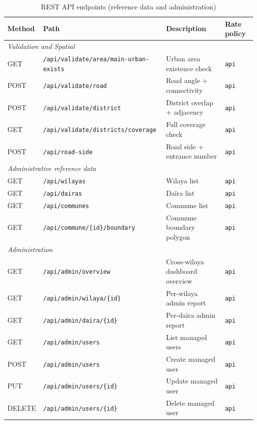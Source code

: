 \documentclass[12pt,a4paper]{article}
\theoremstyle{definition}
\theoremstyle{plain}
\theoremstyle{remark}
\begin{document}
\begin{table}[H]
\centering
\caption{REST API endpoints (reference data and administration)}
\begin{tabularx}{\textwidth}{ll>{\raggedright\arraybackslash}Xl}
\toprule
\textbf{Method} & \textbf{Path} & \textbf{Description} & \textbf{Rate policy} \\
\midrule
\multicolumn{4}{l}{\textit{Validation and Spatial}} \\
GET  & \texttt{/api/validate/area/main-urban-exists} & Urban area existence check & \texttt{api} \\
POST & \texttt{/api/validate/road}                   & Road angle + connectivity  & \texttt{api} \\
POST & \texttt{/api/validate/district}               & District overlap + adjacency & \texttt{api} \\
GET  & \texttt{/api/validate/districts/coverage}     & Full coverage check        & \texttt{api} \\
POST & \texttt{/api/road-side}                       & Road side + entrance number & \texttt{api} \\
\midrule
\multicolumn{4}{l}{\textit{Administrative reference data}} \\
GET & \texttt{/api/wilayas}                 & Wilaya list                & \texttt{api} \\
GET & \texttt{/api/dairas}                  & Da\"ira list               & \texttt{api} \\
GET & \texttt{/api/communes}                & Commune list               & \texttt{api} \\
GET & \texttt{/api/commune/\{id\}/boundary} & Commune boundary polygon   & \texttt{api} \\
\midrule
\multicolumn{4}{l}{\textit{Administration}} \\
GET  & \texttt{/api/admin/overview}            & Cross-wilaya dashboard overview & \texttt{api} \\
GET  & \texttt{/api/admin/wilaya/\{id\}}       & Per-wilaya admin report         & \texttt{api} \\
GET  & \texttt{/api/admin/daira/\{id\}}        & Per-da\"ira admin report        & \texttt{api} \\
GET  & \texttt{/api/admin/users}               & List managed users              & \texttt{api} \\
POST & \texttt{/api/admin/users}               & Create managed user             & \texttt{api} \\
PUT  & \texttt{/api/admin/users/\{id\}}        & Update managed user             & \texttt{api} \\
DELETE & \texttt{/api/admin/users/\{id\}}       & Delete managed user             & \texttt{api} \\
\bottomrule
\end{tabularx}
\end{table}
\end{document}
